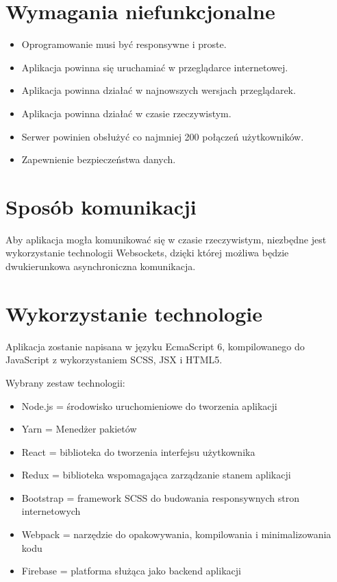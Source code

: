 \section{Wymagania niefunkcjonalne}

\begin{itemize}
    \item Oprogramowanie musi być responsywne i proste.
    \item Aplikacja powinna się uruchamiać w przeglądarce internetowej.
    \item Aplikacja powinna działać w najnowszych wersjach przeglądarek.
    \item Aplikacja powinna działać w czasie rzeczywistym.
    \item Serwer powinien obsłużyć co najmniej 200 połączeń użytkowników.
    \item Zapewnienie bezpieczeństwa danych.
\end{itemize}

\section{Sposób komunikacji}

Aby aplikacja mogła komunikować się w czasie rzeczywistym, niezbędne jest wykorzystanie
technologii Websockets, dzięki której możliwa będzie dwukierunkowa asynchroniczna komunikacja.

\section{Wykorzystanie technologie}

Aplikacja zostanie napisana w języku EcmaScript 6, kompilowanego do JavaScript
z wykorzystaniem SCSS, JSX i HTML5.

Wybrany zestaw technologii:
\begin{itemize}
    \item Node.js = środowisko uruchomieniowe do tworzenia aplikacji
    \item Yarn = Menedżer pakietów
    \item React =  biblioteka do tworzenia interfejsu użytkownika
    \item Redux = biblioteka wspomagająca zarządzanie stanem aplikacji
    \item Bootstrap = framework SCSS do budowania responsywnych stron internetowych
    \item Webpack = narzędzie do opakowywania, kompilowania i minimalizowania kodu
    \item Firebase = platforma służąca jako backend aplikacji
\end{itemize}

